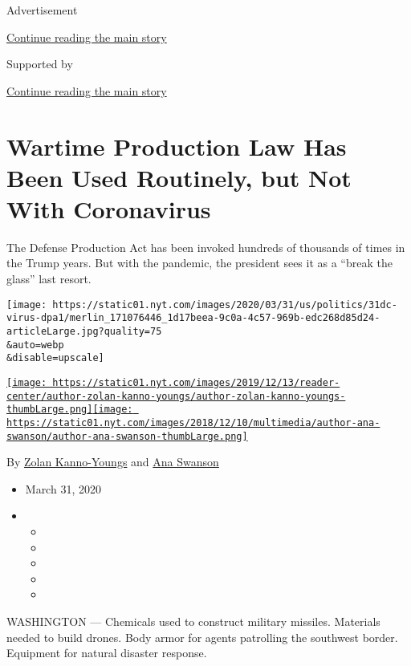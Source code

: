 Advertisement

\protect\hyperlink{after-top}{Continue reading the main story}

Supported by

\protect\hyperlink{after-sponsor}{Continue reading the main story}

\hypertarget{wartime-production-law-has-been-used-routinely-but-not-with-coronavirus}{%
\section{Wartime Production Law Has Been Used Routinely, but Not With
Coronavirus}\label{wartime-production-law-has-been-used-routinely-but-not-with-coronavirus}}

The Defense Production Act has been invoked hundreds of thousands of
times in the Trump years. But with the pandemic, the president sees it
as a ``break the glass'' last resort.

\texttt{[image: https://static01.nyt.com/images/2020/03/31/us/politics/31dc-virus-dpa1/merlin\_171076446\_1d17beea-9c0a-4c57-969b-edc268d85d24-articleLarge.jpg?quality=75\\\&auto=webp\\\&disable=upscale]}

\href{https://www.nytimes.com/by/zolan-kanno-youngs}{\texttt{[image: https://static01.nyt.com/images/2019/12/13/reader-center/author-zolan-kanno-youngs/author-zolan-kanno-youngs-thumbLarge.png]}}\href{https://www.nytimes.com/by/ana-swanson}{\texttt{[image: https://static01.nyt.com/images/2018/12/10/multimedia/author-ana-swanson/author-ana-swanson-thumbLarge.png]}}

By \href{https://www.nytimes.com/by/zolan-kanno-youngs}{Zolan
Kanno-Youngs} and \href{https://www.nytimes.com/by/ana-swanson}{Ana
Swanson}

\begin{itemize}
\item
  March 31, 2020
\item
  \begin{itemize}
  \item
  \item
  \item
  \item
  \item
  \end{itemize}
\end{itemize}

WASHINGTON --- Chemicals used to construct military missiles. Materials
needed to build drones. Body armor for agents patrolling the southwest
border. Equipment for natural disaster response.

